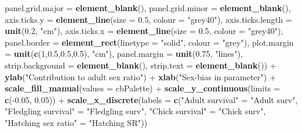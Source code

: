 \documentclass[]{article}
\newenvironment{Shaded}{\begin{snugshade}}{\end{snugshade}}
\newcommand{\KeywordTok}[1]{\textcolor[rgb]{0.13,0.29,0.53}{\textbf{{#1}}}}
\newcommand{\DataTypeTok}[1]{\textcolor[rgb]{0.13,0.29,0.53}{{#1}}}
\newcommand{\DecValTok}[1]{\textcolor[rgb]{0.00,0.00,0.81}{{#1}}}
\newcommand{\FloatTok}[1]{\textcolor[rgb]{0.00,0.00,0.81}{{#1}}}
\newcommand{\StringTok}[1]{\textcolor[rgb]{0.31,0.60,0.02}{{#1}}}
\newcommand{\NormalTok}[1]{{#1}}
\begin{document}
\begin{Shaded}
\begin{Highlighting}[]
                \DataTypeTok{panel.grid.major =} \KeywordTok{element_blank}\NormalTok{(),}
                \DataTypeTok{panel.grid.minor =} \KeywordTok{element_blank}\NormalTok{(),}
                \DataTypeTok{axis.ticks.y =} \KeywordTok{element_line}\NormalTok{(}\DataTypeTok{size =} \FloatTok{0.5}\NormalTok{, }\DataTypeTok{colour =} \StringTok{"grey40"}\NormalTok{),}
                \DataTypeTok{axis.ticks.length =} \KeywordTok{unit}\NormalTok{(}\FloatTok{0.2}\NormalTok{, }\StringTok{"cm"}\NormalTok{),}
                \DataTypeTok{axis.ticks.x =} \KeywordTok{element_line}\NormalTok{(}\DataTypeTok{size =} \FloatTok{0.5}\NormalTok{, }\DataTypeTok{colour =} \StringTok{"grey40"}\NormalTok{),}
                \DataTypeTok{panel.border =} \KeywordTok{element_rect}\NormalTok{(}\DataTypeTok{linetype =} \StringTok{"solid"}\NormalTok{, }\DataTypeTok{colour =} \StringTok{"grey"}\NormalTok{),}
                \DataTypeTok{plot.margin =} \KeywordTok{unit}\NormalTok{(}\KeywordTok{c}\NormalTok{(}\DecValTok{1}\NormalTok{,}\FloatTok{0.5}\NormalTok{,}\FloatTok{0.5}\NormalTok{,}\FloatTok{0.5}\NormalTok{), }\StringTok{"cm"}\NormalTok{),}
                \DataTypeTok{panel.margin =} \KeywordTok{unit}\NormalTok{(}\FloatTok{0.75}\NormalTok{, }\StringTok{"lines"}\NormalTok{),}
                \DataTypeTok{strip.background =} \KeywordTok{element_blank}\NormalTok{(), }
                \DataTypeTok{strip.text =} \KeywordTok{element_blank}\NormalTok{()) +}
\StringTok{          }\KeywordTok{ylab}\NormalTok{(}\StringTok{"Contribution to adult sex ratio"}\NormalTok{) +}
\StringTok{          }\KeywordTok{xlab}\NormalTok{(}\StringTok{"Sex-bias in parameter"}\NormalTok{) +}
\StringTok{          }\KeywordTok{scale_fill_manual}\NormalTok{(}\DataTypeTok{values =} \NormalTok{cbPalette) +}
\StringTok{          }\KeywordTok{scale_y_continuous}\NormalTok{(}\DataTypeTok{limits =} \KeywordTok{c}\NormalTok{(-}\FloatTok{0.05}\NormalTok{, }\FloatTok{0.05}\NormalTok{)) +}
\StringTok{          }\KeywordTok{scale_x_discrete}\NormalTok{(}\DataTypeTok{labels =} \KeywordTok{c}\NormalTok{(}\StringTok{"Adult survival"} \NormalTok{=}\StringTok{ "Adult surv"}\NormalTok{,}
                                      \StringTok{"Fledgling survival"} \NormalTok{=}\StringTok{ "Fledgling surv"}\NormalTok{,}
                                      \StringTok{"Chick survival"} \NormalTok{=}\StringTok{ "Chick surv"}\NormalTok{,}
                                      \StringTok{"Hatching sex ratio"} \NormalTok{=}\StringTok{ "Hatching SR"}\NormalTok{))}
\end{Highlighting}
\end{Shaded}
\end{document}
